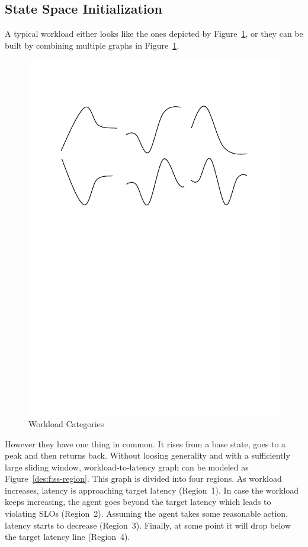 \subsection{State Space Initialization}
\label{des:state-init}
A typical workload either looks like the ones depicted by Figure~\ref{fig:workload}, or they can be built by combining multiple graphs in Figure~\ref{fig:workload}. 
\begin{figure}[H]
    \centering
    \includegraphics[clip, trim=2.7cm 17.5cm 3cm 3.7cm]{workload-type.pdf}
    \caption{Workload Categories}
    \label{fig:workload}
\end{figure}
However they have one thing in common. It rises from a base state, goes to a peak and then returns back. Without loosing generality and with a sufficiently large sliding window, workload-to-latency graph can be modeled as Figure~\ref{des:f:ss-region}. This graph is divided into four regions. As workload increases, latency is approaching target latency (Region~1). In case the workload keeps increasing, the agent goes beyond the target latency which leads to violating SLOs (Region~2). Assuming the agent takes some reasonable action, latency starts to decrease (Region~3). Finally, at some point it will drop below the target latency line (Region~4).
